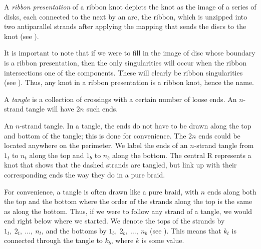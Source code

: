 \begin{paper}
A \textit{ribbon presentation} of a ribbon knot depicts the knot as the image of
a series of disks, each connected to the next by an arc, the ribbon, which is
unzipped into two antiparallel strands after applying the mapping that sends the
discs to the knot (see \figPresentation).

It is important to note that if we were to fill in the image of disc whose
boundary is a ribbon presentation, then the only singularities will occur when
the ribbon intersections one of the components.
These will clearly be ribbon singularities (see \figSingularities).
Thus, any knot in a ribbon presentation is a ribbon knot, hence the name.


A \textit{tangle} is a collection of crossings with a certain number of loose
ends.
An $n$-strand tangle will have $2n$ such ends.

{An $n$-strand tangle.
In a tangle, the ends do not have to be drawn along the top and bottom of the
tangle; this is done for convenience.
The $2n$ ends could be located anywhere on the perimeter.
We label the ends of an $n$-strand tangle from $1_t$ to $n_t$ along the top and
$1_b$ to $n_b$ along the bottom.
The central R represents a knot that shows that the dashed strands are tangled,
but link up with their corresponding ends the way they do in a pure braid.}

For convenience, a tangle is often drawn like a pure braid, with $n$ ends along
both the top and the bottom where the order of the strands along the top is the
same as along the bottom.
Thus, if we were to follow any strand of a tangle, we would end right below
where we started.
We denote the tops of the strands by $1_t,~2_t,~\dots,~n_t$, and the
bottoms  by $1_b,~2_b,~\dots,~n_b$ (see \figTangle).
This means that $k_t$ is connected through the tangle to $k_b$, where $k$ is
some value.


\end{paper}
